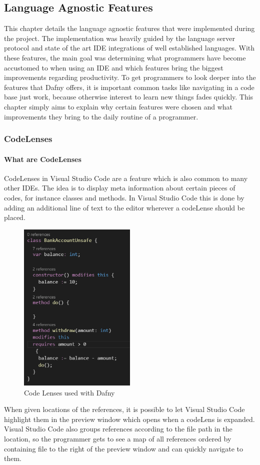 \subsection{Language Agnostic Features}\label{agfeatures}
This chapter details the language agnostic features that were implemented during the project. The implementation was heavily guided by the language server protocol and state of the art IDE integrations of well established languages. With these features, the main goal was determining what programmers have become accustomed to when using an IDE and which features bring the biggest improvements regarding productivity. To get programmers to look deeper into the features that Dafny offers, it is important common tasks like navigating in a code base just work, because otherwise interest to learn new things fades quickly. \newline
This chapter simply aims to explain why certain features were chosen and what improvements they bring to the daily routine of a programmer.
\subsubsection{CodeLenses} \label{agcodelenses}
\paragraph{What are CodeLenses}
CodeLenses in Visual Studio Code are a feature which is also common to many other IDEs. The idea is to display meta information about certain pieces of codes, for instance classes and methods. In Visual Studio Code this is done  by adding an additional line of text to the editor wherever a codeLense should be placed. \newline
\begin{figure}[H]
	\centering
	\includegraphics[width=0.5\textwidth]{img/codelensesClosed}
	\caption{Code Lenses used with Dafny}
	\label{fig:agcodelensesclosed}
\end{figure}
When given locations of the references, it is possible to let Visual Studio Code highlight them in the preview window which opens when a codeLens is expanded. Visual Studio Code also groups references according to the file path in the location, so the programmer gets to see a map of all references ordered by containing file to the right of the preview window and can quickly navigate to them.
